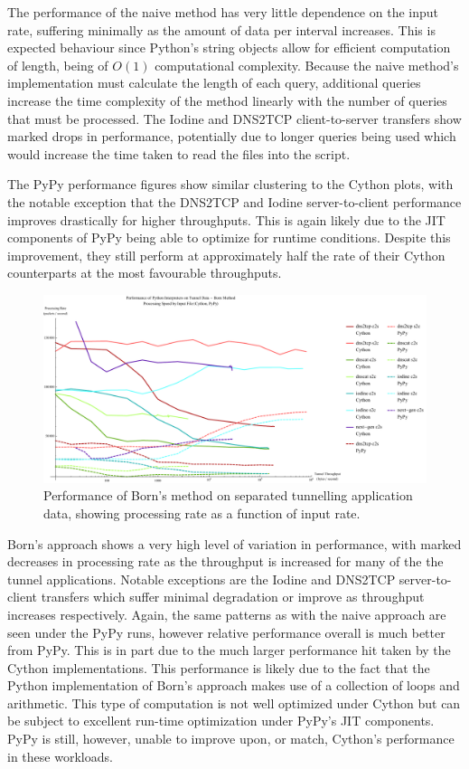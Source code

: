 \documentclass[12pt]{report}
\theoremstyle{remark}
\theoremstyle{definition}
\theoremstyle{definition}
\theoremstyle{definition}
\begin{document}
The performance of the naive method has very little dependence on the input
rate, suffering minimally as the amount of data per interval increases. This is
expected behaviour since Python's string objects allow for efficient computation of
length, being of $O(1)$ computational complexity\cite{python-strlencplx}.
Because the naive method's implementation must calculate the length of each
query, additional queries increase the time complexity of the method linearly
with the number of queries that must be processed. The Iodine and DNS2TCP
client-to-server transfers show marked drops in performance, potentially due to
longer queries being used which would increase the time taken to read the files
into the script.

The PyPy performance figures show similar clustering to the Cython plots, with
the notable exception that the DNS2TCP and Iodine server-to-client performance
improves drastically for higher throughputs. This is again likely due to the JIT
components of PyPy being able to optimize for runtime conditions. Despite this
improvement, they still perform at approximately half the rate of their Cython
counterparts at the most favourable throughputs.

\begin{figure}
\centering
\includegraphics[width=\textwidth]{figures/ppia-born.pdf}
\caption[Performance of Born's Method on Tunnel Data by Python
Interpreter]{Performance of Born's method on separated tunnelling application
data, showing processing rate as a function of input rate.}
\label{ppia-born}
\end{figure}

Born's approach shows a very high level of variation in performance, with marked
decreases in processing rate as the throughput is increased for many of the the
tunnel applications. Notable exceptions are the Iodine and DNS2TCP
server-to-client transfers which suffer minimal degradation or improve as
throughput increases respectively. Again, the same patterns as with the naive
approach are seen under the PyPy runs, however relative performance overall is much
better from PyPy. This is in part due to the much larger performance hit taken
by the Cython implementations. This performance is likely due to the fact that
the Python implementation of Born's approach makes use of a collection of loops
and arithmetic. This type of computation is not well optimized under Cython but
can be subject to excellent run-time optimization under PyPy's JIT components.
PyPy is still, however, unable to improve upon, or match, Cython's performance in these
workloads.
\end{document}

